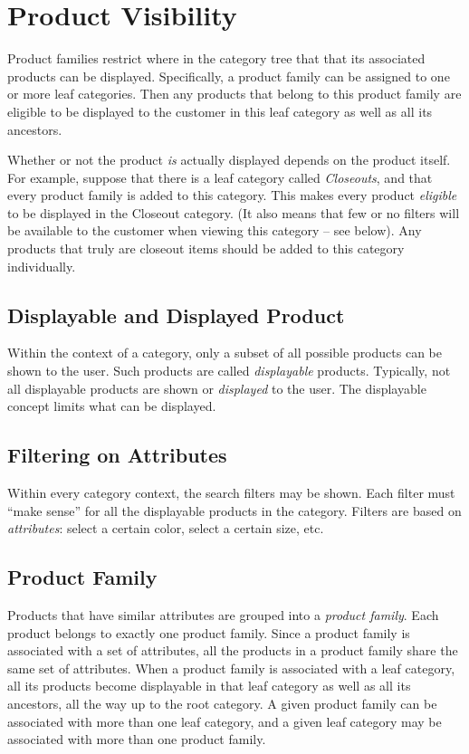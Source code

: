 \documentclass[letterpaper, 12pt]{article}
\begin{document}
\section{Product Visibility}
Product families restrict where in the category tree that that its associated products can be displayed.  Specifically, a product family can be assigned to one or more leaf categories.  Then any products that belong to this product family are eligible to be displayed to the customer in this leaf category as well as all its ancestors.

Whether or not the product \textit{is} actually displayed depends on the product itself.  For example, suppose that there is a leaf category called \textit{Closeouts}, and that every product family is added to this category.  This makes every product \textit{eligible} to be displayed in the Closeout category.  (It also means that few or no filters will be available to the customer when viewing this category -- see below).  Any products that truly are closeout items should be added to this category individually.

\subsection{Displayable and Displayed Product}
Within the context of a category, only a subset of all possible products can be shown to the user.  Such products are called {\em displayable} products.  Typically, not all displayable products are shown or {\em displayed} to the user.  The displayable concept limits what can be displayed.

\subsection{Filtering on Attributes}
Within every category context, the search filters may be shown.  Each filter must ``make sense'' for all the displayable products in the category.  Filters are based on {\em attributes}: select a certain color, select a certain size, etc.

\subsection{Product Family}
Products that have similar attributes are grouped into a {\em product family}.  Each product belongs to exactly one product family.  Since a product family is associated with a set of attributes, all the products in a product family share the same set of attributes.  When a product family is associated with a leaf category, all its products become displayable in that leaf category as well as all its ancestors, all the way up to the root category.  A given product family can be associated with more than one leaf category, and a given leaf category may be associated with more than one product family.
\end{document}
